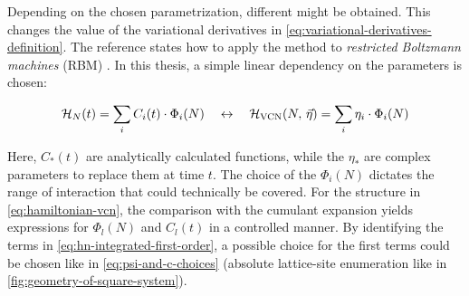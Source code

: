 Depending on the chosen parametrization, different \Hvcn{\vec{\eta}} might be obtained. 
This changes the value of the variational derivatives in \autoref{eq:variational-derivatives-definition}.
The reference \cite{VCNsolutionForRBM} states how to apply the method to \emph{restricted Boltzmann machines} (RBM) \cite{neuralNetworkQuantumStates}.
In this thesis, a simple linear dependency on the parameters is chosen:

\begin{equation}
    \label{eq:hamiltonian-vcn}
    \HNOft = \lsum[i] C_i(t) \cdot \Phi_i(N) \quad\leftrightarrow\quad \Hvcn{\vec{\eta}} = \lsum[i] \eta_i \cdot \Phi_i(N)
\end{equation}

Here, $C_\ast(t)$ are analytically calculated functions, while the $\eta_\ast$ are complex parameters to replace them at time $t$.
The choice of the $\Phi_i(N)$ dictates the range of interaction that could technically be covered.
For the structure in \autoref{eq:hamiltonian-vcn}, the comparison with the cumulant expansion yields expressions for $\Phi_l(N)$ and $C_l(t)$ in a controlled manner.
By identifying the terms in \autoref{eq:hn-integrated-first-order}, a possible choice for the first terms could be chosen like in \autoref{eq:psi-and-c-choices} (absolute lattice-site enumeration like in \autoref{fig:geometry-of-square-system}). 


